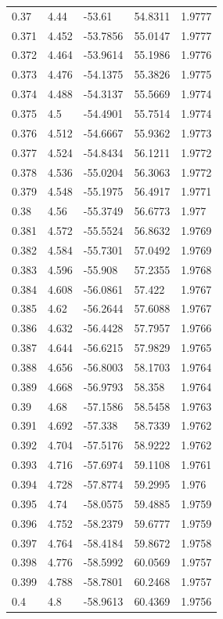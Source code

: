 \begin{tabular}{lllll}
0.37 & 4.44 & -53.61 & 54.8311 & 1.9777 \\
0.371 & 4.452 & -53.7856 & 55.0147 & 1.9777 \\
0.372 & 4.464 & -53.9614 & 55.1986 & 1.9776 \\
0.373 & 4.476 & -54.1375 & 55.3826 & 1.9775 \\
0.374 & 4.488 & -54.3137 & 55.5669 & 1.9774 \\
0.375 & 4.5 & -54.4901 & 55.7514 & 1.9774 \\
0.376 & 4.512 & -54.6667 & 55.9362 & 1.9773 \\
0.377 & 4.524 & -54.8434 & 56.1211 & 1.9772 \\
0.378 & 4.536 & -55.0204 & 56.3063 & 1.9772 \\
0.379 & 4.548 & -55.1975 & 56.4917 & 1.9771 \\
0.38 & 4.56 & -55.3749 & 56.6773 & 1.977 \\
0.381 & 4.572 & -55.5524 & 56.8632 & 1.9769 \\
0.382 & 4.584 & -55.7301 & 57.0492 & 1.9769 \\
0.383 & 4.596 & -55.908 & 57.2355 & 1.9768 \\
0.384 & 4.608 & -56.0861 & 57.422 & 1.9767 \\
0.385 & 4.62 & -56.2644 & 57.6088 & 1.9767 \\
0.386 & 4.632 & -56.4428 & 57.7957 & 1.9766 \\
0.387 & 4.644 & -56.6215 & 57.9829 & 1.9765 \\
0.388 & 4.656 & -56.8003 & 58.1703 & 1.9764 \\
0.389 & 4.668 & -56.9793 & 58.358 & 1.9764 \\
0.39 & 4.68 & -57.1586 & 58.5458 & 1.9763 \\
0.391 & 4.692 & -57.338 & 58.7339 & 1.9762 \\
0.392 & 4.704 & -57.5176 & 58.9222 & 1.9762 \\
0.393 & 4.716 & -57.6974 & 59.1108 & 1.9761 \\
0.394 & 4.728 & -57.8774 & 59.2995 & 1.976 \\
0.395 & 4.74 & -58.0575 & 59.4885 & 1.9759 \\
0.396 & 4.752 & -58.2379 & 59.6777 & 1.9759 \\
0.397 & 4.764 & -58.4184 & 59.8672 & 1.9758 \\
0.398 & 4.776 & -58.5992 & 60.0569 & 1.9757 \\
0.399 & 4.788 & -58.7801 & 60.2468 & 1.9757 \\
0.4 & 4.8 & -58.9613 & 60.4369 & 1.9756 \\

\end{tabular}
